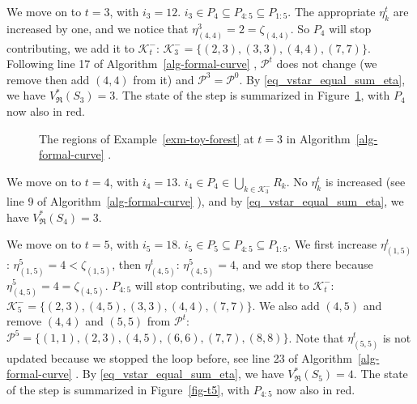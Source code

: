 \documentclass[
  11pt,
  a4paper,
]{article}
\theoremstyle{plain}
\theoremstyle{definition}
\theoremstyle{plain}
\theoremstyle{definition}
\theoremstyle{plain}
\theoremstyle{remark}
\begin{document}
We move on to \(t=3\), with \(i_3=12\).
\(i_3\in P_4\subseteq P_{4:5}\subseteq P_{1:5}\). The appropriate
\(\eta_k^t\) are increased by one, and we notice that
\(\eta_{(4, 4)}^3=2=\zeta_{(4, 4)}\). So \(P_4\) will stop contributing,
we add it to \(\mathcal{K}^-_t\):
\(\mathcal{K}^-_3=\{(2,3), (3,3), (4, 4), (7, 7)\}\). Following line 17
of  Algorithm~\ref{alg-formal-curve} , \(\mathcal{P}^t\) does not change
(we remove then add \((4,4)\) from it) and
\(\mathcal{P}^3=\mathcal{P}^0\). By \eqref{eq_vstar_equal_sum_eta}, we
have \(V^*_{\mathfrak{R}}(S_3)=3\). The state of the step is summarized
in Figure~\ref{fig-t3}, with \(P_4\) now also in red.

\begin{figure}


\caption{\label{fig-t3}The regions of Example~\ref{exm-toy-forest} at
\(t=3\) in  Algorithm~\ref{alg-formal-curve} .}

\end{figure}%

We move on to \(t=4\), with \(i_4=13\).
\(i_4\in P_4\in \bigcup_{k\in\mathcal{K}^-_3}R_k\). No \(\eta_k^t\) is
increased (see line 9 of  Algorithm~\ref{alg-formal-curve} ), and by
\eqref{eq_vstar_equal_sum_eta}, we have \(V^*_{\mathfrak{R}}(S_4)=3\).

We move on to \(t=5\), with \(i_5=18\).
\(i_5\in P_5\subseteq P_{4:5}\subseteq P_{1:5}\). We first increase
\(\eta_{(1,5)}^t\): \(\eta_{(1,5)}^5=4<\zeta_{(1,5)}\), then
\(\eta_{(4,5)}^t\): \(\eta_{(4,5)}^5=4\), and we stop there because
\(\eta_{(4,5)}^5=4=\zeta_{(4,5)}\). \(P_{4:5}\) will stop contributing,
we add it to \(\mathcal{K}^-_t\):
\(\mathcal{K}^-_5=\{(2,3), (4,5), (3,3), (4, 4), (7, 7)\}\). We also add
\((4,5)\) and remove \((4,4)\) and \((5,5)\) from \(\mathcal{P}^t\):
\(\mathcal{P}^5=\{(1,1), (2,3), (4,5), (6,6), (7,7), (8,8)\}\). Note
that \(\eta_{(5,5)}^t\) is not updated because we stopped the loop
before, see line 23 of  Algorithm~\ref{alg-formal-curve} . By
\eqref{eq_vstar_equal_sum_eta}, we have \(V^*_{\mathfrak{R}}(S_5)=4\).
The state of the step is summarized in Figure~\ref{fig-t5}, with
\(P_{4:5}\) now also in red.
\end{document}
